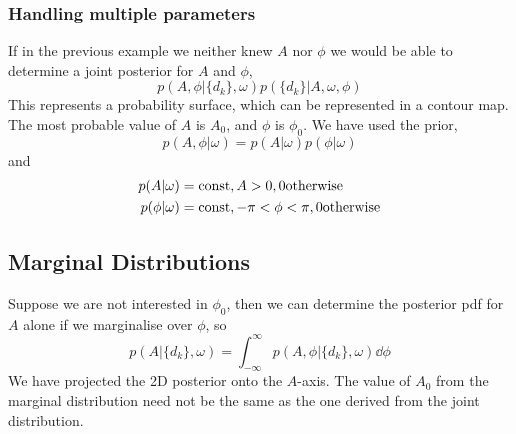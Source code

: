 \documentclass{dwnotes}         		        %
\begin{document}
\subsubsection{Handling multiple parameters}
\label{sec:handl-mult-param}

If in the previous example we neither knew $A$ nor $\phi$ we would be
able to determine a joint posterior for $A$ and $\phi$,
\[ p(A, \phi | \{ d_k \}, \omega) p ( \{ d_k \} | A, \omega, \phi ) \]
This represents a probability surface, which can be represented in a
contour map. The most probable value of $A$ is $A_0$, and $\phi$ is
$\phi_0$. We have used the prior,
\[ p(A, \phi | \omega) = p(A|\omega) p(\phi|\omega) \]
and 
\begin{align*}
  p(A|\omega) &= {\rm const}, A>0, 0 {\rm otherwise} \\
p(\phi | \omega) &= {\rm const}, -\pi < \phi < \pi, 0 {\rm otherwise}
\end{align*}

\subsection{Marginal Distributions}
\label{sec:marg-distr}

Suppose we are not interested in $\phi_0$, then we can determine the
posterior pdf for $A$ alone if we marginalise over $\phi$, so
\[ p(A | \{ d_k \}, \omega) = \int_{-\infty}^{\infty} p(A, \phi | \{
d_k \}, \omega) \dd{\phi} \] We have projected the 2D posterior onto
the $A$-axis. The value of $A_0$ from the marginal distribution need
not be the same as the one derived from the joint distribution.
\end{document}
